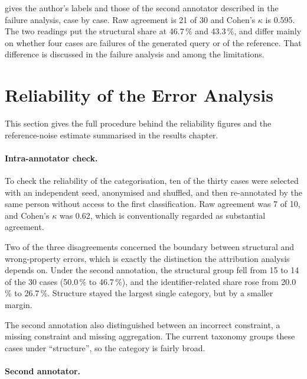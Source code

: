 

 gives the author's labels and those of the second annotator described in the failure analysis, case by case.
Raw agreement is 21 of 30 and Cohen's $\kappa$ is 0.595.
The two readings put the structural share at 46.7\,\% and 43.3\,\%, and differ mainly on whether four cases are failures of the generated query or of the reference.
That difference is discussed in the failure analysis and among the limitations.



\section{Reliability of the Error Analysis}
\label{app:reliability}

This section gives the full procedure behind the reliability figures and the reference-noise estimate summarised in the results chapter.

\paragraph{Intra-annotator check.}

To check the reliability of the categorisation, ten of the thirty cases were selected with an independent seed, anonymised and shuffled, and then re-annotated by the same person without access to the first classification.
Raw agreement was 7 of 10, and Cohen's $\kappa$ was 0.62, which is conventionally regarded as substantial agreement.

Two of the three disagreements concerned the boundary between structural and wrong-property errors, which is exactly the distinction the attribution analysis depends on.
Under the second annotation, the structural group fell from 15 to 14 of the 30 cases (50.0\,\% to 46.7\,\%), and the identifier-related share rose from 20.0\,\% to 26.7\,\%.
Structure stayed the largest single category, but by a smaller margin.

The second annotation also distinguished between an incorrect constraint, a missing constraint and missing aggregation.
The current taxonomy groups these cases under ``structure'', so the category is fairly broad.

\paragraph{Second annotator.}

